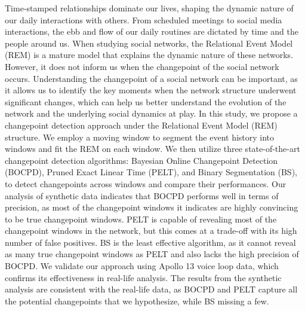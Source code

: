 \documentclass[]{interact}
\theoremstyle{plain}%
\theoremstyle{definition}
\theoremstyle{remark}
\begin{document}
	Time-stamped relationships dominate our lives, shaping the dynamic nature of our daily interactions with others. From scheduled meetings to social media interactions, the ebb and flow of our daily routines are dictated by time and the people around us. When studying social networks, the Relational Event Model (REM) is a mature model that explains the dynamic nature of these networks. However, it does not inform us when the changepoint of the social network occurs. Understanding the changepoint of a social network can be important, as it allows us to identify the key moments when the network structure underwent significant changes, which can help us better understand the evolution of the network and the underlying social dynamics at play. In this study, we propose a changepoint detection approach under the Relational Event Model (REM) structure. We employ a moving window to segment the event history into windows and fit the REM on each window. We then utilize three state-of-the-art changepoint detection algorithms: Bayesian Online Changepoint Detection (BOCPD), Pruned Exact Linear Time (PELT), and Binary Segmentation (BS), to detect changepoints across windows and compare their performances. Our analysis of synthetic data indicates that BOCPD performs well in terms of precision, as most of the changepoint windows it indicates are highly convincing to be true changepoint windows. PELT is capable of revealing most of the changepoint windows in the network, but this comes at a trade-off with its high number of false positives. BS is the least effective algorithm, as it cannot reveal as many true changepoint windows as PELT and also lacks the high precision of BOCPD. We validate our approach using Apollo 13 voice loop data, which confirms its effectiveness in real-life analysis. The results from the synthetic analysis are consistent with the real-life data, as BOCPD and PELT capture all the potential changepoints that we hypothesize, while BS missing a few. \\
	
\end{document}

